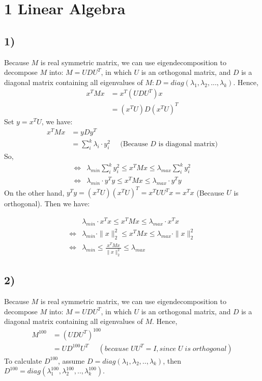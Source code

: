 \documentclass{article}
\begin{document}
\section*{1 Linear Algebra}
\subsection*{1)}
Because $M$ is real symmetric matrix, we can use eigendecomposition to decompose $M$ into: $ M = UDU^{T}$, in which $U$ is an orthogonal matrix, and $D$ is a diagonal matrix containing all eigenvalues of $M: D = diag(\lambda_{1}, \lambda_{2},..., \lambda_{k})$. Hence,
\begin{align*}
x^{T}Mx &= x^{T}(UDU^{T})x\\
&= (x^{T}U)D(x^{T}U)^{T}
\end{align*}
Set $y = x^{T}U$, we have:
\begin{align*}
x^{T}Mx &= yDy^{T}\\
&= \sum\limits_{i}^{k}\lambda_{i} \cdot y_{i}^2\;\;\;\;\;\text{(Because $D$ is diagonal matrix)}
\end{align*}
So,
\begin{align*}
\iff & \lambda_{min}\sum\limits_{i}^{k}y_{i}^2 \leq x^{T}Mx \leq  \lambda_{max}\sum\limits_{i}^{k}y_{i}^2\\
\iff & \lambda_{min} \cdot y^{T}y \leq x^{T}Mx \leq  \lambda_{max} \cdot y^{T}y
\end{align*}
On the other hand, $y^{T}y = (x^{T}U)(x^{T}U)^{T} = x^{T}UU^{T}x = x^{T}x$ (Because $U$ is orthogonal). Then we have:

\begin{align*}
& \lambda_{min} \cdot x^{T}x \leq x^{T}Mx \leq  \lambda_{max} \cdot x^{T}x\\
\iff & \lambda_{min} \cdot \|x\|_{2}^{2} \leq x^{T}Mx \leq  \lambda_{max} \cdot \|x\|_{2}^{2}\\
\iff & \lambda_{min} \leq \frac{x^{T}Mx}{\|x\|_{2}^{2}} \leq \lambda_{max}
\end{align*}

\subsection*{2)}
Because $M$ is real symmetric matrix, we can use eigendecomposition to decompose $M$ into: $ M = UDU^{T}$, in which $U$ is an orthogonal matrix, and $D$ is a diagonal matrix containing all eigenvalues of $M$. Hence,
\begin{align*}
M^{100} &= (UDU^{T})^{100}\\
&= UD^{100}U^{T}\;\;\;\;\;(because\;UU^{T} = I, since\;U\;is\;orthogonal)
\end{align*}
To calculate $D^{100}$, assume $D = diag(\lambda_{1}, \lambda_{2},..,\lambda_{k})$, then $D^{100} = diag(\lambda_{1}^{100}, \lambda_{2}^{100},..,\lambda_{k}^{100})$.
\end{document}
